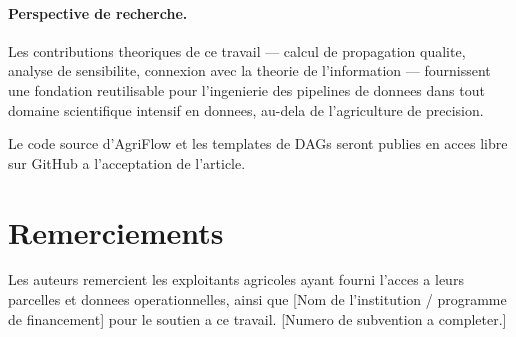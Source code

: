 \documentclass[12pt,a4paper]{article}
\theoremstyle{plain}
\theoremstyle{definition}
\theoremstyle{remark}
\begin{document}
\paragraph{Perspective de recherche.}
Les contributions theoriques de ce travail --- calcul de propagation
qualite, analyse de sensibilite, connexion avec la theorie de
l'information --- fournissent une fondation reutilisable pour
l'ingenierie des pipelines de donnees dans tout domaine scientifique
intensif en donnees, au-dela de l'agriculture de precision.

Le code source d'AgriFlow et les templates de DAGs seront publies
en acces libre sur GitHub a l'acceptation de l'article.

\section*{Remerciements}

Les auteurs remercient les exploitants agricoles ayant fourni l'acces
a leurs parcelles et donnees operationnelles, ainsi que
[Nom de l'institution / programme de financement] pour le soutien
a ce travail. [Numero de subvention a completer.]
\end{document}
